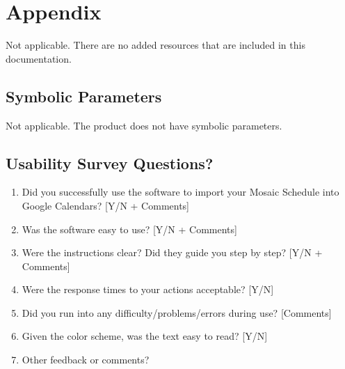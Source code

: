 \documentclass[12pt, titlepage]{article}
\begin{document}
\section{Appendix}
\color{blue}
Not applicable. There are no added resources that are included in this documentation.
\color{black}

\subsection{Symbolic Parameters}
\color{blue}
Not applicable. The product does not have symbolic parameters.
\color{black}

\subsection{Usability Survey Questions?}
\begin{enumerate}
\color{blue}
\item Did you successfully use the software to import your Mosaic Schedule into Google Calendars? [Y/N + Comments]

\item Was the software easy to use? [Y/N + Comments]

\item Were the instructions clear? Did they guide you step by step? [Y/N + Comments]

\item Were the response times to your actions acceptable? [Y/N]

\item Did you run into any difficulty/problems/errors during use? [Comments]

\item Given the color scheme, was the text easy to read? [Y/N]

\item Other feedback or comments?

\end{enumerate}
\end{document}

